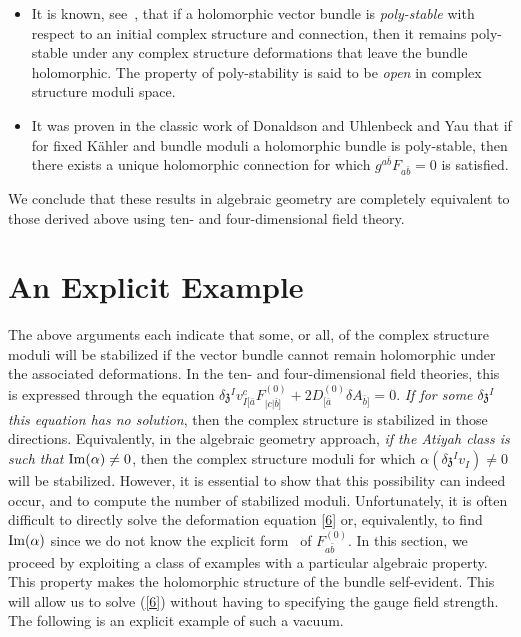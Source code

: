 \documentclass[12pt]{article}
\numberwithin{equation}{section}
\newcommand{\eref}[1]{(\ref{#1})}
\begin{document}
\begin{itemize}

\item It is known, see~\cite{Huybrechts}, that if a holomorphic
  vector bundle is {\it poly-stable} with respect to an initial complex
  structure and connection, then it remains poly-stable under any
  complex structure deformations that leave the bundle
  holomorphic. The property of poly-stability is said to be {\it open}
  in complex structure moduli space.

\item It was proven in the classic work of Donaldson \cite{duy2} and Uhlenbeck and Yau \cite{duy1} that if for fixed K\"ahler and bundle moduli a holomorphic bundle is poly-stable, then there exists a unique holomorphic connection for which $g^{a{\bar{b}}} F_{a{\bar{b}}} =0$ is satisfied.

\end{itemize}

\noindent We conclude that these results in algebraic geometry are completely equivalent to those derived above using ten- and four-dimensional field theory. 



\section{An Explicit Example}

The above arguments each indicate that some, or all, of the complex
structure moduli will be stabilized if the vector bundle cannot remain
holomorphic under the associated deformations.  In the ten- and
four-dimensional field theories, this is expressed through the
equation $\delta {\mathfrak{z}}^{I} v_{I
  [{\bar{a}}}^{c}F_{|c|{\bar{b}}]}^{(0)} + 2D^{(0)}_{[{\bar{a}}}
\delta A_{{\bar{b}}]}=0$. {\it If for some $\delta {\mathfrak{z}}^{I}$
  this equation has no solution}, then the complex structure is
stabilized in those directions. Equivalently, in the algebraic
geometry approach, {\it if the Atiyah class is such that ${\rm Im} (\alpha)
  \neq 0$}, then the complex structure moduli for which $\alpha
(\delta\mathfrak{z}^{I}v_I) \neq 0$ will be stabilized. However, it is
essential to show that this possibility can indeed occur, and to
compute the number of stabilized moduli. Unfortunately, it is often
difficult to directly solve the deformation equation \eqref{6} or,
equivalently, to find ${\rm Im}(\alpha)$ since we do not know the explicit
form~\cite{Anderson:2010ke} of $F_{a{\bar{b}}}^{(0)}$. In this section, we proceed by
exploiting a class of examples with a particular algebraic
property. This property makes the holomorphic structure of the bundle
self-evident. This will allow us to solve \eref{6} without having to
specifying the gauge field strength. The following is an explicit example of such a vacuum.
\end{document}
